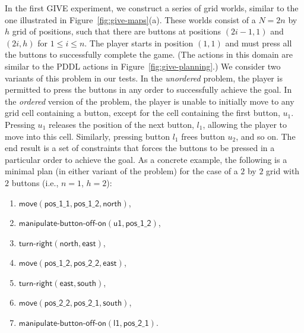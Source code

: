 In the first GIVE experiment, we construct a series of grid worlds, similar to
the one illustrated in Figure~\ref{fig:give-maps}(a). These worlds consist of a
$N = 2n$ by $h$ grid of positions, such that there are buttons at positions
$(2i-1,1)$ and $(2i,h)$ for $1 \leq i \leq n$. The player starts in position
$(1,1)$ and must press all the buttons to successfully complete the game.  (The
actions in this domain are similar to the PDDL actions in
Figure~\ref{fig:give-planning}.) We consider two variants of this problem in our
tests. In the \emph{unordered} problem, the player is permitted to press the
buttons in any order to successfully achieve the goal. In the \emph{ordered}
version of the problem, the player is unable to initially move to any grid cell
containing a button, except for the cell containing the first button, $u_1$.
Pressing $u_1$ releases the position of the next button, $l_1$, allowing the
player to move into this cell.  Similarly, pressing button $l_1$ frees button
$u_2$, and so on. The end result is a set of constraints that forces the buttons
to be pressed in a particular order to achieve the goal. As a concrete example,
the following is a minimal plan (in either variant of the problem) for the case
of a $2$ by $2$ grid with $2$ buttons (i.e., $n=1$, $h=2$):

\begin{enumerate}
\item $\mathsf{move}(\mathsf{pos\_1\_1},\mathsf{pos\_1\_2}, \mathsf{north})$,
\item $\mathsf{manipulate}\textsf{-}\mathsf{button}\textsf{-}\mathsf{off}\textsf{-}\mathsf{on}(\mathsf{u1, pos\_1\_2})$,
\item $\mathsf{turn}\textsf{-}\mathsf{right}(\mathsf{north}, \mathsf{east})$,
\item $\mathsf{move}(\mathsf{pos\_1\_2}, \mathsf{pos\_2\_2},
  \mathsf{east})$,
\item $\mathsf{turn}\textsf{-}\mathsf{right}(\mathsf{east}, \mathsf{south})$,
\item $\mathsf{move}(\mathsf{pos\_2\_2}, \mathsf{pos\_2\_1}, \mathsf{south})$,
\item $\mathsf{manipulate}\textsf{-}\mathsf{button}\textsf{-}\mathsf{off}\textsf{-}\mathsf{on}(\mathsf{l1, pos\_2\_1})$.
\end{enumerate}

